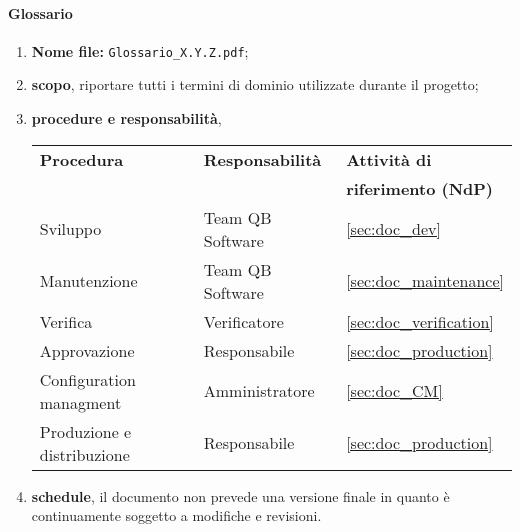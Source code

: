        \paragraph{Glossario}
        	\begin{enumerate}
        	\item \textbf{Nome file:} \texttt{Glossario\_X.Y.Z.pdf};
        	\item \textbf{scopo}, riportare tutti i termini di dominio utilizzate durante il progetto;
        	\item \textbf{procedure e responsabilità},
        	\\
        	\begin{tabularx}{0.93\textwidth}{|X|X|X|}
        		\hline
        		\textbf{Procedura} & \textbf{Responsabilità} & \textbf{Attività di} \\
        		& & \textbf{riferimento (NdP)} \\
        		\hline
        		Sviluppo & Team QB Software &  \ref{sec:doc_dev}
        		\\\hline
        		Manutenzione & Team QB Software & \ref{sec:doc_maintenance} 
        		\\\hline
        		Verifica & Verificatore & \ref{sec:doc_verification}
        		\\\hline
        		Approvazione & Responsabile & \ref{sec:doc_production}
        		\\\hline
        		Configuration managment & Amministratore & \ref{sec:doc_CM}
        		\\\hline
        		Produzione e distribuzione & Responsabile & \ref{sec:doc_production}
        		\\\hline
        	\end{tabularx}
        	\item \textbf{schedule}, il documento non prevede una versione finale in quanto è continuamente soggetto a modifiche e revisioni. 
        \end{enumerate}

